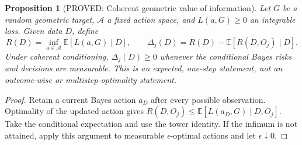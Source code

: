 \documentclass[11pt]{article}
\newcommand{\E}{\mathbb E}
\newtheorem{proposition}[theorem]{Proposition}
\theoremstyle{definition}
\theoremstyle{remark}
\begin{document}
\begin{proposition}[PROVED: Coherent geometric value of information]
\label{rthreegeo:coherence}
Let $G$ be a random geometric target, $\mathcal A$ a fixed action space,
and $L(a,G)\ge0$ an integrable loss. Given data $D$, define
\[
 R(D)=\inf_{a\in\mathcal A}\E[L(a,G)\mid D],\qquad
 \Delta_j(D)=R(D)-\E[R(D,O_j)\mid D].
\]
Under coherent conditioning, $\Delta_j(D)\ge0$ whenever the conditional
Bayes risks and decisions are measurable. This is an expected, one-step
statement, not an outcome-wise or multistep-optimality statement.
\end{proposition}
\begin{proof}
Retain a current Bayes action $a_D$ after every possible observation.
Optimality of the updated action gives
$R(D,O_j)\le\E[L(a_D,G)\mid D,O_j]$.
Take the conditional expectation and use the tower identity. If the
infimum is not attained, apply this argument to measurable
$\epsilon$-optimal actions and let $\epsilon\downarrow0$.
\end{proof}
\end{document}
